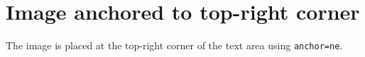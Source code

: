 \documentclass{article}
\begin{document}
\section*{Image anchored to top-right corner}

The image is placed at the top-right corner of the text area using
\texttt{anchor=ne}.

\lipsum[1-5]
\end{document}
